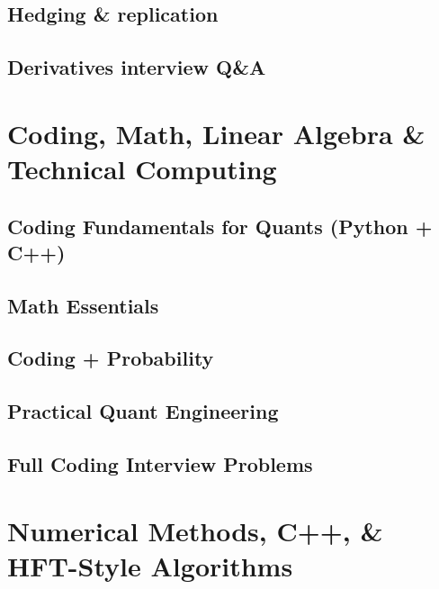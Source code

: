 \documentclass{report}
\begin{document}
\section{Hedging \& replication}
\section{Derivatives interview Q\&A}

\newpage



\chapter{Coding, Math, Linear Algebra \& Technical Computing}

\section{Coding Fundamentals for Quants (Python + C++)}

\section{Math Essentials}

\section{Coding + Probability}

\section{Practical Quant Engineering}

\section{Full Coding Interview Problems}

\newpage

\chapter{Numerical Methods, C++, \& HFT-Style Algorithms}
\end{document}
